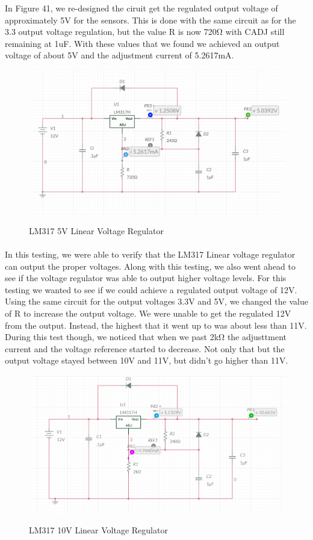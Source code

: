 In Figure 41, we re-designed the ciruit get the regulated output voltage of approximately 5V for the sensors. This is done with the same circuit as for the 3.3 output voltage regulation, but the value R is now 720Ω with CADJ still remaining at 1uF. With these values that we found we achieved an output voltage of about 5V and the adjustment current of 5.2617mA.\par
\begin{figure}[H]
    \centering
    \caption{LM317 5V Linear Voltage Regulator}
    \includegraphics[width=\textwidth]{images/LM317_5_schematic.png}
    \label{fig:5V-linear-voltage-regulator}
\end{figure}
\paragraph{}In this testing, we were able to verify that the LM317 Linear voltage regulator can output the proper voltages. Along with this testing, we also went ahead to see if the voltage regulator was able to output higher voltage levels. For this testing we wanted to see if we could achieve a regulated output voltage of 12V. Using the same circuit for the output voltages 3.3V and 5V, we changed the value of R to increase the output voltage. We were unable to get the regulated 12V from the output. Instead, the highest that it went up to was about less than 11V. During this test though, we noticed that when we past 2kΩ the adjusttment current and the voltage reference started to decrease. Not only that but the output voltage stayed between 10V and 11V, but didn't go higher than 11V.
\begin{figure}[H]
    \centering
    \caption{LM317 10V Linear Voltage Regulator}
    \includegraphics[width=\textwidth]{images/LM317_10_schematic.png}
    \label{fig:10V-linear-voltage-regulator}
\end{figure}
